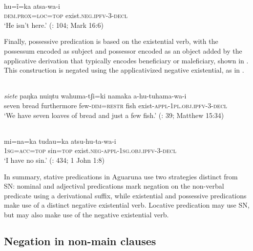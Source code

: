 \documentclass[output=paper,colorlinks,citecolor=brown,draft]{langscibook}
\begin{document}
\ea\label{ex:agu:27}
     \\ 
           hu=ĩ=ka  atsa-wa-i \\
           \textsc{dem.prox=loc=top}  exist.\textsc{neg.ipfv-3-decl} \\
    \glt ‘He isn’t here.’ (\citealt{LigaBíblica2008}: 104; Mark 16:6)
\z 
          
Finally, possessive predication is based on the existential verb, with the possessum encoded as subject and possessor encoded as an object added by the applicative derivation that typically encodes beneficiary or maleficiary, shown in . This construction is negated using the applicativized negative existential, as in .

\ea\label{ex:agu:28}
    \\ 
          \textit{siete}  paŋka  nuiŋtu  wahuma-tʃi=ki  namaka a-hu-tuhama-wa-i \\
          seven  bread  furthermore  few-\textsc{dim=restr}  fish   exist-\textsc{appl-1pl.obj.ipfv-3-decl} \\
    \glt ‘We have seven loaves of bread and just a few fish.’ (\citealt{LigaBíblica2008}: 39; Matthew 15:34)
\z 

\ea\label{ex:agu:29}
     \\ 
          mi=na=ka  tudau=ka  atsu-hu-ta-wa-i \\
          \textsc{1sg=acc=top}  sin=\textsc{top}  exist.\textsc{neg-appl-1sg.obj.ipfv-3-decl} \\
    \glt ‘I have no sin.’ (\citealt{LigaBíblica2008}: 434; 1 John 1:8)
\z 

In summary, stative predications in Aguaruna use two strategies distinct from SN: nominal and adjectival predications mark negation on the non-verbal predicate using a derivational suffix, while existential and possessive predications make use of a distinct negative existential verb. Locative predication may use SN, but may also make use of the negative existential verb. 

\subsection{Negation in non-main clauses}\label{sec:agu:2.4}
\end{document}
